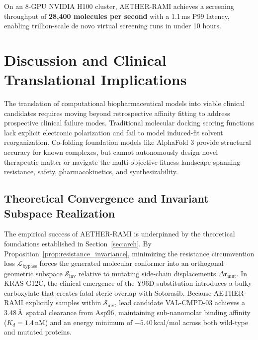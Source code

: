 \documentclass[10pt,journal,compsoc]{IEEEtran}
\begin{document}
\begin{table}[h]
\caption{Hardware Scaling and Screening Throughput Benchmarks}
\label{tab:gpu_scaling}
\centering
\small
{}
\end{table}

On an 8-GPU NVIDIA H100 cluster, AETHER-RAMI achieves a screening throughput of \textbf{28,400 molecules per second} with a 1.1\,ms P99 latency, enabling trillion-scale de novo virtual screening runs in under 10 hours.

\section{Discussion and Clinical Translational Implications}
\label{sec:discussion}
The translation of computational biopharmaceutical models into viable clinical candidates requires moving beyond retrospective affinity fitting to address prospective clinical failure modes. Traditional molecular docking scoring functions lack explicit electronic polarization and fail to model induced-fit solvent reorganization. Co-folding foundation models like AlphaFold 3 provide structural accuracy for known complexes, but cannot autonomously design novel therapeutic matter or navigate the multi-objective fitness landscape spanning resistance, safety, pharmacokinetics, and synthesizability.

\subsection{Theoretical Convergence and Invariant Subspace Realization}
The empirical success of AETHER-RAMI is underpinned by the theoretical foundations established in Section~\ref{sec:arch}. By Proposition~\ref{prop:resistance_invariance}, minimizing the resistance circumvention loss $\mathcal{L}_{\text{bypass}}$ forces the generated molecular conformer into an orthogonal geometric subspace $\mathcal{S}_{\text{inv}}$ relative to mutating side-chain displacements $\Delta \mathbf{r}_{\text{mut}}$. In KRAS G12C, the clinical emergence of the Y96D substitution introduces a bulky carboxylate that creates fatal steric overlap with Sotorasib. Because AETHER-RAMI explicitly samples within $\mathcal{S}_{\text{inv}}$, lead candidate VAL-CMPD-03 achieves a 3.48\,\AA\ spatial clearance from Asp96, maintaining sub-nanomolar binding affinity ($K_d = 1.4$\,nM) and an energy minimum of $-5.40$\,kcal/mol across both wild-type and mutated proteins.
\end{document}
